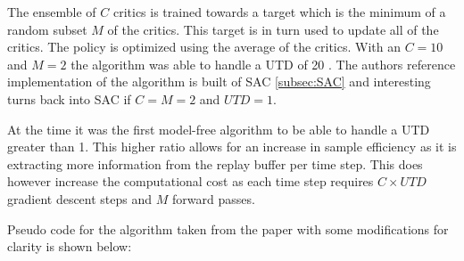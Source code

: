 The ensemble of $C$ critics is trained towards a target which is the minimum of a random subset $M$ of the critics. This target is in turn used to update all of the critics. The policy is optimized using the average of the critics. With an $C = 10$ and $M = 2$ the algorithm was able to handle a UTD of 20 \cite{chenRandomizedEnsembledDouble2021}. The authors reference implementation of the algorithm is built of SAC \ref{subsec:SAC} and interesting turns back into SAC if $C=M=2$ and $UTD=1$.

At the time it was the first model-free algorithm to be able to handle a UTD greater than 1. This higher ratio allows for an increase in sample efficiency as it is extracting more information from the replay buffer per time step. This does however increase the computational cost as each time step requires $C \times UTD$ gradient descent steps and $M$ forward passes.

Pseudo code for the algorithm taken from the paper \cite{chenRandomizedEnsembledDouble2021} with some modifications for clarity is shown below:


